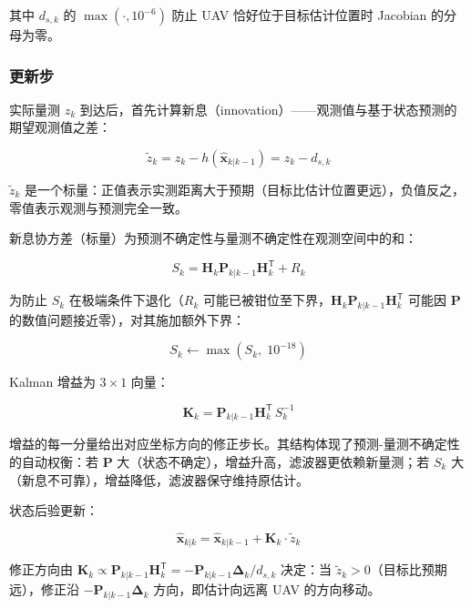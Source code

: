 其中 $d_{s,k}$ 的 $\max(\cdot, 10^{-6})$ 防止 UAV 恰好位于目标估计位置时 Jacobian 的分母为零。

\subsubsection{更新步}

实际量测 $z_k$ 到达后，首先计算新息（innovation）——观测值与基于状态预测的期望观测值之差：

\begin{equation}
\tilde{z}_k = z_k - h(\hat{\mathbf{x}}_{k|k-1}) = z_k - d_{s,k}
\label{eq:ekf_innov}
\end{equation}

$\tilde{z}_k$ 是一个标量：正值表示实测距离大于预期（目标比估计位置更远），负值反之，零值表示观测与预测完全一致。

新息协方差（标量）为预测不确定性与量测不确定性在观测空间中的和：

\begin{equation}
S_k = \mathbf{H}_k \mathbf{P}_{k|k-1} \mathbf{H}_k^{\mathsf{T}} + R_k
\label{eq:ekf_Sk}
\end{equation}

为防止 $S_k$ 在极端条件下退化（$R_k$ 可能已被钳位至下界，$\mathbf{H}_k \mathbf{P}_{k|k-1} \mathbf{H}_k^{\mathsf{T}}$ 可能因 $\mathbf{P}$ 的数值问题接近零），对其施加额外下界：

\begin{equation}
S_k \leftarrow \max(S_k,\; 10^{-18})
\label{eq:ekf_Sk_clamp}
\end{equation}

Kalman 增益为 $3 \times 1$ 向量：

\begin{equation}
\mathbf{K}_k = \mathbf{P}_{k|k-1} \mathbf{H}_k^{\mathsf{T}} \, S_k^{-1}
\label{eq:ekf_Kk}
\end{equation}

增益的每一分量给出对应坐标方向的修正步长。其结构体现了预测-量测不确定性的自动权衡：若 $\mathbf{P}$ 大（状态不确定），增益升高，滤波器更依赖新量测；若 $S_k$ 大（新息不可靠），增益降低，滤波器保守维持原估计。

状态后验更新：

\begin{equation}
\hat{\mathbf{x}}_{k|k} = \hat{\mathbf{x}}_{k|k-1} + \mathbf{K}_k \cdot \tilde{z}_k
\label{eq:ekf_x_post}
\end{equation}

修正方向由 $\mathbf{K}_k \propto \mathbf{P}_{k|k-1} \mathbf{H}_k^{\mathsf{T}} = -\mathbf{P}_{k|k-1} \bm{\Delta}_k / d_{s,k}$ 决定：当 $\tilde{z}_k > 0$（目标比预期远），修正沿 $-\mathbf{P}_{k|k-1} \bm{\Delta}_k$ 方向，即估计向远离 UAV 的方向移动。

